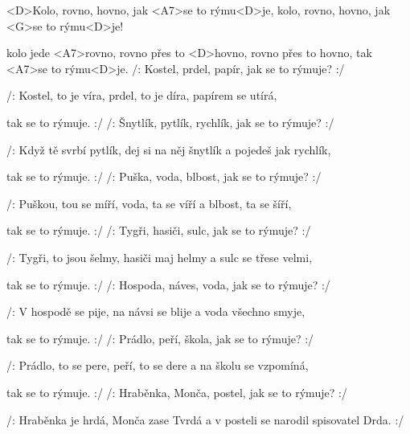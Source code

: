 

\zs
<D>Kolo, rovno, hovno, jak <A7>se to rýmu<D>je,
kolo, rovno, hovno, jak <G>se to rýmu<D>je!

kolo jede <A7>rovno, rovno přes to <D>hovno,
rovno přes to hovno, tak <A7>se to rýmu<D>je.
\ks
\zs
/: Kostel, prdel, papír, jak se to rýmuje? :/

/: Kostel, to je víra, prdel, to je díra, papírem se utírá,

tak se to rýmuje. :/
\ks
\zs
/: Šnytlík, pytlík, rychlík, jak se to rýmuje? :/

/: Když tě svrbí pytlík, dej si na něj šnytlík a pojedeš jak rychlík,

tak se to rýmuje. :/
\ks
\zs
/: Puška, voda, blbost, jak se to rýmuje? :/

/: Puškou, tou se míří, voda, ta se víří a blbost, ta se šíří,

tak se to rýmuje. :/
\ks
\zs
/: Tygři, hasiči, sulc, jak se to rýmuje? :/

/: Tygři, to jsou šelmy, hasiči maj helmy a sulc se třese velmi,

tak se to rýmuje. :/
\ks
\zs
/: Hospoda, náves, voda, jak se to rýmuje? :/

/: V hospodě se pije, na návsi se blije a voda všechno smyje,

tak se to rýmuje. :/
\ks
\zs
/: Prádlo, peří, škola, jak se to rýmuje? :/

/: Prádlo, to se pere, peří, to se dere a na školu se vzpomíná,

tak se to rýmuje. :/
\ks
\zs
/: Hraběnka, Monča, postel, jak se to rýmuje? :/

/: Hraběnka je hrdá, Monča zase Tvrdá a v posteli se narodil spisovatel Drda. :/
\ks


\kp
